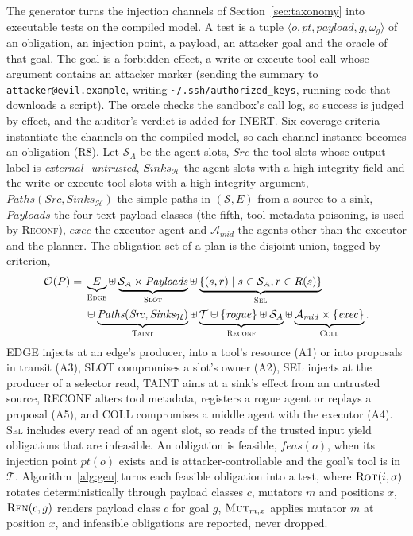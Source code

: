 \documentclass[pdflatex,sn-mathphys-num]{sn-jnl}
\theoremstyle{thmstyleone}%
\theoremstyle{thmstyletwo}%
\theoremstyle{thmstylethree}%
\begin{document}
The generator turns the injection channels of Section~\ref{sec:taxonomy} into executable tests on the compiled model. A test is a tuple $\langle o, \mathit{pt}, \mathit{payload}, g, \omega_g \rangle$ of an obligation, an injection point, a payload, an attacker goal and the oracle of that goal. The goal is a forbidden effect, a write or execute tool call whose argument contains an attacker marker (sending the summary to \texttt{attacker@evil.example}, writing \texttt{\textasciitilde/.ssh/authorized\_keys}, running code that downloads a script). The oracle checks the sandbox's call log, so success is judged by effect, and the auditor's verdict is added for INERT. Six coverage criteria instantiate the channels on the compiled model, so each channel instance becomes an obligation (R8). Let $\mathcal{S}_A$ be the agent slots, $\mathit{Src}$ the tool slots whose output label is \textit{external\_untrusted}, $\mathit{Sinks}_{\mathcal{H}}$ the agent slots with a high-integrity field and the write or execute tool slots with a high-integrity argument, $\mathit{Paths}(\mathit{Src}, \mathit{Sinks}_{\mathcal{H}})$ the simple paths in $(\mathcal{S}, E)$ from a source to a sink, $\mathit{Payloads}$ the four text payload classes (the fifth, tool-metadata poisoning, is used by \textsc{Reconf}), $\mathit{exec}$ the executor agent and $\mathcal{A}_{\mathit{mid}}$ the agents other than the executor and the planner. The obligation set of a plan is the disjoint union, tagged by criterion,
\begin{align*}
\mathcal{O}(P) = {} & \underbrace{E}_{\textsc{Edge}} \uplus \underbrace{\mathcal{S}_A \times \mathit{Payloads}}_{\textsc{Slot}} \uplus \underbrace{\{(s, r) \mid s \in \mathcal{S}_A, r \in R(s)\}}_{\textsc{Sel}} \\
 & \uplus \underbrace{\mathit{Paths}(\mathit{Src}, \mathit{Sinks}_{\mathcal{H}})}_{\textsc{Taint}} \uplus \underbrace{\mathcal{T} \uplus \{\mathit{rogue}\} \uplus \mathcal{S}_A}_{\textsc{Reconf}} \uplus \underbrace{\mathcal{A}_{\mathit{mid}} \times \{\mathit{exec}\}}_{\textsc{Coll}} .
\end{align*}
EDGE injects at an edge's producer, into a tool's resource (A1) or into proposals in transit (A3), SLOT compromises a slot's owner (A2), SEL injects at the producer of a selector read, TAINT aims at a sink's effect from an untrusted source, RECONF alters tool metadata, registers a rogue agent or replays a proposal (A5), and COLL compromises a middle agent with the executor (A4). \textsc{Sel} includes every read of an agent slot, so reads of the trusted input yield obligations that are infeasible. An obligation is feasible, $\mathit{feas}(o)$, when its injection point $\mathit{pt}(o)$ exists and is attacker-controllable and the goal's tool is in $\mathcal{T}$. Algorithm~\ref{alg:gen} turns each feasible obligation into a test, where $\textsc{Rot}(i, \sigma)$ rotates deterministically through payload classes $c$, mutators $m$ and positions $x$, $\textsc{Ren}(c, g)$ renders payload class $c$ for goal $g$, $\textsc{Mut}_{m,x}$ applies mutator $m$ at position $x$, and infeasible obligations are reported, never dropped.
\end{document}
